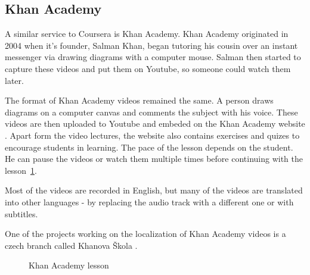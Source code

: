 \subsection{Khan Academy}
A similar service to Coursera is Khan Academy. Khan Academy originated in 2004 when it's founder, Salman Khan, began tutoring his cousin over an instant messenger via drawing diagrams with a computer mouse. Salman then started to capture these videos and put them on Youtube, so someone could watch them later.

The format of Khan Academy videos remained the same. A person draws diagrams on a computer canvas and comments the subject with his voice. These videos are then uploaded to Youtube and embeded on the Khan Academy website \cite{14}. Apart form the video lectures, the website also contains exercises and quizes to encourage students in learning. The pace of the lesson depends on the student. He can pause the videos or watch them multiple times before continuing with the lesson~\ref{fig:khan-screen}.

Most of the videos are recorded in English, but many of the videos are translated into other languages - by replacing the audio track with a different one or with subtitles.

One of the projects working on the localization of Khan Academy videos is a czech branch called Khanova Škola \cite{15}.

\begin{figure}
	\centering
	\caption{Khan Academy lesson}
	\label{fig:khan-screen}
\end{figure}